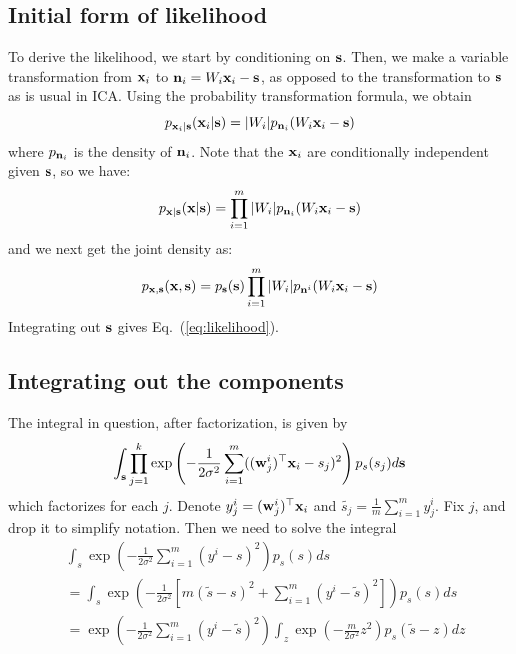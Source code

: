 \documentclass{report}
\begin{document}
{\subsection{Initial form of likelihood}\label{sec:appendix:likelihood_transform}

To derive the likelihood, we start by conditioning on $\mathbf{s}$. Then, we make a variable transformation from $\mathbf{x}_i$ to $\mathbf{n}_i=W_i\mathbf{x}_i-\mathbf{s}$, as opposed to the transformation to $\mathbf{s}$ as is usual in ICA. Using the probability transformation formula, we obtain
\begin{equation}
p_{\mathbf{x}_i|\mathbf{s}}(\mathbf{x}_i|\mathbf{s})=|W_i|p_{\mathbf{n}_i}(W_i\mathbf{x}_i-\mathbf{s})    
\end{equation}
where $p_{\mathbf{n}_i}$ is the density of $\mathbf{n}_i$. Note that the $\mathbf{x}_i$ are conditionally independent given $\mathbf{s}$, so we have:
\begin{equation}
  p_{\mathbf{x}|\mathbf{s}}(\mathbf{x}|\mathbf{s})=\prod_{i=1}^m  |W_i| p_{\mathbf{n}_i}(W_i\mathbf{x}_i-\mathbf{s})
\end{equation}
and we next get the joint density as:
\begin{equation}
  p_{\mathbf{x}, \mathbf{s}}(\mathbf{x},\mathbf{s})=p_{\mathbf{s}}(\mathbf{s}) \prod_{i=1}^m  |W_i| p_{\mathbf{n}^i}(W_i\mathbf{x}_i-\mathbf{s})
\end{equation}
Integrating out $\mathbf{s}$ gives Eq.~(\ref{eq:likelihood}).


\subsection{Integrating out the components}\label{sec:appendix:integration}

The integral in question, after factorization, is given by
\begin{equation}
\int_{\mathbf{s}} \prod_{j=1}^k \exp \left( -\frac{1}{2\sigma^2} \sum_{i=1}^m ((\mathbf{w}_j^i)^{\top}\mathbf{x}_i-s_j)^2 \right) p_{s}(s_j) d\mathbf{s}
\end{equation}
which factorizes for each $j$. Denote $y^i_j=(\mathbf{w}_j^i)^{\top}\mathbf{x}_i$ and $\tilde{s_j}=\frac1m\sum_{i=1}^m y^i_j$.  Fix $j$, and drop it to simplify notation. Then we need to solve the integral
\begin{align*}
   &\int_s \exp \left(-\frac{1}{2\sigma^2} \sum_{i=1}^m (y^i-s)^2 \right) p_{s}(s)ds\\
   &=\int_s \exp \left(-\frac{1}{2\sigma^2} [ m(\tilde{s}-s)^2 + \sum_{i=1}^m (y^i-\tilde{s})^2] \right) p_{s}(s)ds \\ 
&= \exp \left(-\frac{1}{2\sigma^2}\sum_{i=1}^m (y^i-\tilde{s})^2 \right) 
\int_z \exp \left(-\frac{m}{2\sigma^2} z^2 \right) p_{s}(\tilde{s}-z) dz
\end{align*}

}
\end{document}
